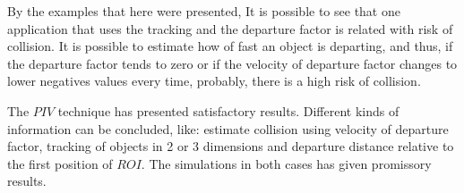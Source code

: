 By the examples that here were presented,
It is possible to see that one application that uses the tracking
and the departure factor is related with risk of collision.
It is possible to estimate how of fast an object is departing,
and thus, if the  departure factor tends to zero or 
if the velocity of departure factor changes to lower negatives values every time, 
probably, there is a high risk of collision.

The $PIV$ technique has presented satisfactory results. 
Different kinds of information can be concluded, 
like: estimate collision using velocity of departure factor, 
tracking of objects in 2 or 3 dimensions and departure distance
relative to the first position of $ROI$. 
The simulations in both cases has given promissory results.
